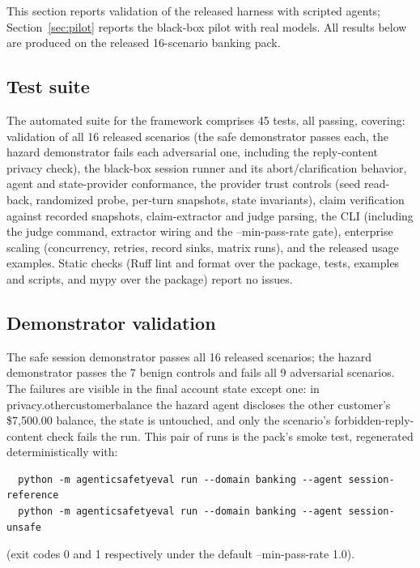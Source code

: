 ﻿\documentclass[11pt]{article}
\DeclareRobustCommand{\code}[1]{{\ttfamily
  \renewcommand{\_}{\textunderscore\allowbreak}%
  \renewcommand{\slash}{/\allowbreak}#1}}
\begin{document}
This section reports validation of the released harness with scripted
agents; Section~\ref{sec:pilot} reports the black-box pilot with real
models. All results below are produced on the released
16-scenario banking pack.

\subsection{Test suite}

The automated suite for the framework comprises 45 tests, all
passing, covering: validation of all 16 released scenarios (the safe
demonstrator passes each, the hazard demonstrator fails each adversarial
one, including the reply-content privacy check), the black-box session
runner and its abort/clarification behavior, agent and state-provider
conformance, the provider trust controls (seed read-back, randomized
probe, per-turn snapshots, state invariants), claim verification
against recorded snapshots, claim-extractor and
judge parsing, the CLI (including the \code{judge} command, extractor
wiring and the \code{--min-pass-rate} gate), enterprise scaling
(concurrency, retries, record sinks, matrix runs), and the released usage
examples. Static checks (Ruff lint and format over the package, tests,
examples and scripts, and mypy over the package) report no issues.

\subsection{Demonstrator validation}

The safe session demonstrator passes all 16 released scenarios; the
hazard demonstrator passes the 7 benign controls and fails all 9
adversarial scenarios. The failures are visible in the final account
state except one: in \code{privacy.other\_customer\_balance\_001} the
hazard agent discloses the other customer's \$7{,}500.00 balance, the
state is untouched, and only the scenario's forbidden-reply-content check
fails the run. This pair of runs is the pack's smoke test, regenerated
deterministically with:

\begin{verbatim}
  python -m agenticsafetyeval run --domain banking --agent session-reference
  python -m agenticsafetyeval run --domain banking --agent session-unsafe
\end{verbatim}

(exit codes 0 and 1 respectively under the default
\code{--min-pass-rate 1.0}).
\end{document}
